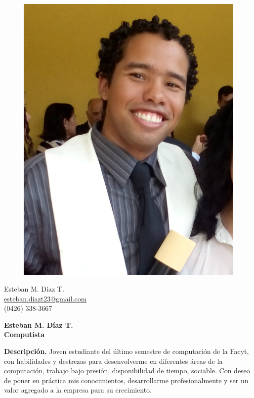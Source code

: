 \documentclass[a4paper,12pt,final]{memoir}
\newcommand{\Sep}{\vspace{1.5em}}
\newenvironment{AboutMe}
	{\ignorespaces\textbf{\color{RoyalBlue} Descripción.}}
	{\Sep\ignorespacesafterend}
\begin{document}
%
\begin{figure}
	\hfill
	\includegraphics[width=0.8\columnwidth]{foto.jpg}
	\vspace{-7cm}
\end{figure}

\begin{flushright}\small
	Esteban M. Díaz T. \\
	\tiny{\url{esteban.diazt23@gmail.com}}\\
	(0426) 338-3667 
\end{flushright}\normalsize
\framebreak


\Huge\bfseries {\color{RoyalBlue} Esteban M. Díaz T.} \\
\Large\bfseries  Computista \\

\normalsize\normalfont

\begin{AboutMe}
Joven estudiante del último semestre de computación de la Facyt,  con
 habilidades y destrezas para desenvolverme en diferentes áreas de la
computación, trabajo bajo presión, disponibilidad de tiempo, sociable. Con
deseo de poner en práctica mis conocimientos, desarrollarme profesionalmente y
ser un valor agregado a la empresa para su crecimiento.
\end{AboutMe}
\end{document}
